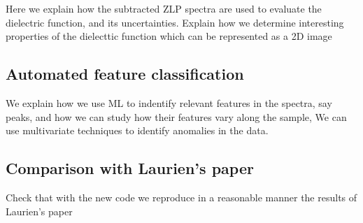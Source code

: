 Here we explain how the subtracted ZLP spectra are used to evaluate the dielectric function,
and its uncertainties.
%
Explain how we determine interesting properties of the dielecttic function
which can be represented as a 2D image


\subsection{Automated feature classification}

We explain how we use ML to indentify relevant features in the spectra, say peaks, and how we can
study how their features vary along the sample,
%
We can use multivariate techniques to identify anomalies in the data.





\subsection{Comparison with Laurien's paper}

Check that with the new code we reproduce in a reasonable
manner the results of Laurien's paper
